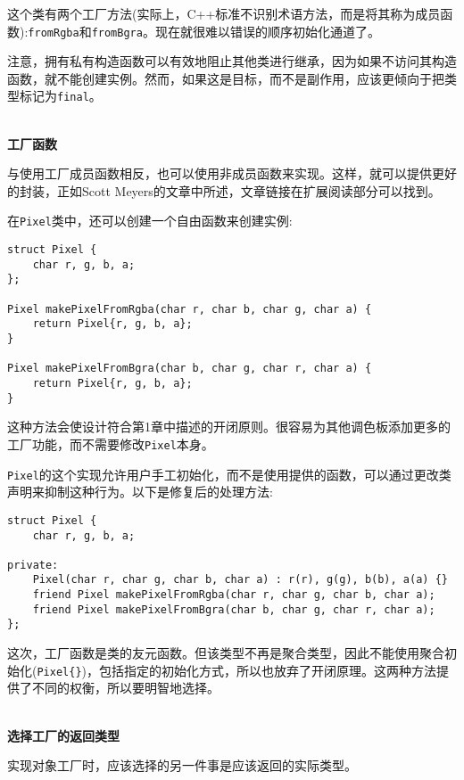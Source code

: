 这个类有两个工厂方法(实际上，C++标准不识别术语方法，而是将其称为成员函数):\texttt{fromRgba}和\texttt{fromBgra}。现在就很难以错误的顺序初始化通道了。

注意，拥有私有构造函数可以有效地阻止其他类进行继承，因为如果不访问其构造函数，就不能创建实例。然而，如果这是目标，而不是副作用，应该更倾向于把类型标记为\texttt{final}。

\hspace*{\fill} \\ %
\noindent
\textbf{工厂函数}

与使用工厂成员函数相反，也可以使用非成员函数来实现。这样，就可以提供更好的封装，正如Scott Meyers的文章中所述，文章链接在扩展阅读部分可以找到。

在\texttt{Pixel}类中，还可以创建一个自由函数来创建实例:

\begin{lstlisting}[style=styleCXX]
struct Pixel {
	char r, g, b, a;
};

Pixel makePixelFromRgba(char r, char b, char g, char a) {
	return Pixel{r, g, b, a};
}

Pixel makePixelFromBgra(char b, char g, char r, char a) {
	return Pixel{r, g, b, a};
}
\end{lstlisting}

这种方法会使设计符合第1章中描述的开闭原则。很容易为其他调色板添加更多的工厂功能，而不需要修改\texttt{Pixel}本身。

\texttt{Pixel}的这个实现允许用户手工初始化，而不是使用提供的函数，可以通过更改类声明来抑制这种行为。以下是修复后的处理方法:

\begin{lstlisting}[style=styleCXX]
struct Pixel {
	char r, g, b, a;
	
private:
	Pixel(char r, char g, char b, char a) : r(r), g(g), b(b), a(a) {}
	friend Pixel makePixelFromRgba(char r, char g, char b, char a);
	friend Pixel makePixelFromBgra(char b, char g, char r, char a);
};
\end{lstlisting}

这次，工厂函数是类的友元函数。但该类型不再是聚合类型，因此不能使用聚合初始化(\texttt{Pixel\{\}})，包括指定的初始化方式，所以也放弃了开闭原理。这两种方法提供了不同的权衡，所以要明智地选择。

\hspace*{\fill} \\ %
\noindent
\textbf{选择工厂的返回类型}

实现对象工厂时，应该选择的另一件事是应该返回的实际类型。

